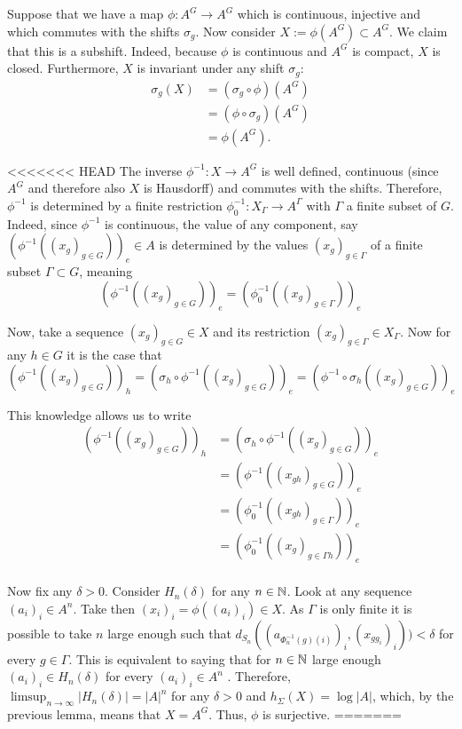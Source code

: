 Suppose that we have a map $\phi: A^G \to A^G$ which is continuous, injective and which commutes with the shifts $\sigma_g$. Now consider $X := \phi(A^G) \subset A^G$. We claim that this is a subshift. Indeed, because $\phi$ is continuous and $A^G$ is compact, $X$ is closed. Furthermore, $X$ is invariant under any shift $\sigma_g$: 
		\begin{align*}
		\sigma_g(X)
		&= (\sigma_g \circ \phi) (A^G) \\
		&= (\phi \circ \sigma_g)(A^G) \\
		&= \phi(A^G).
		\end{align*}
		
<<<<<<< HEAD
The inverse $\phi^{-1}: X \to A^G$ is well defined, continuous (since $A^G$ and therefore also $X$ is Hausdorff) and commutes with the shifts. Therefore,  $\phi^{-1}$ is determined by a finite restriction $\phi^{-1}_0: X_{\Gamma} \to A^{\Gamma}$ with $\Gamma$ a finite subset of $G$. Indeed, since $\phi^{-1}$ is continuous, the value of any component, say $(\phi^{-1}((x_g)_{g \in G}))_e \in A$ is determined by the values $(x_g)_{g \in \Gamma}$ of a finite subset $\Gamma \subset G$, meaning 
		\[
		(\phi^{-1}((x_g)_{g \in G}))_e = (\phi^{-1}_0((x_g)_{g \in \Gamma}))_e
		\]

Now, take a sequence $(x_g)_{g \in G} \in X$ and its restriction $(x_g)_{g \in \Gamma} \in X_{\Gamma}$. Now for any $h \in G$ it is the case that 
		\[
		(\phi^{-1}((x_g)_{g \in G}))_h = (\sigma_h \circ \phi^{-1}((x_g)_{g \in G}))_e  = (\phi^{-1} \circ \sigma_h((x_g)_{g \in G}))_e
		\]

This knowledge allows us to write
		\begin{align*}
		(\phi^{-1}((x_g)_{g \in G}))_h
		&= (\sigma_h \circ \phi^{-1}((x_g)_{g \in G}))_e \\
		&= (\phi^{-1}((x_{gh})_{g \in G}))_e \\
		&= (\phi^{-1}_0((x_{gh})_{g \in \Gamma}))_e \\
		&= (\phi^{-1}_0((x_g)_{g \in \Gamma h}))_e
		\end{align*}
\\
Now fix any $\delta > 0$. Consider $H_n(\delta)$ for any $n \in \mathbb{N}$. Look at any sequence $(a_i)_i \in A^n$. Take then $(x_i)_i = \phi((a_i)_i) \in X$. As $\Gamma$ is only finite it is possible to take $n$ large enough such that $d_{S_n}((a_{\Phi^{-1}_n(g)(i)})_i,(x_{g g_i})_i)) < \delta$ for every $g \in \Gamma$. This is equivalent to saying that for $n \in \mathbb{N}$ large enough $(a_i)_i \in H_n(\delta)$ for every $(a_i)_i \in A^n$ . Therefore, $\limsup_{n \to \infty} |H_n(\delta)| = |A|^{n}$ for any $\delta >0$ and $h_\Sigma(X) = \log |A|$, which, by the previous lemma, means that $X = A^G$. Thus, $\phi$ is surjective.
=======
